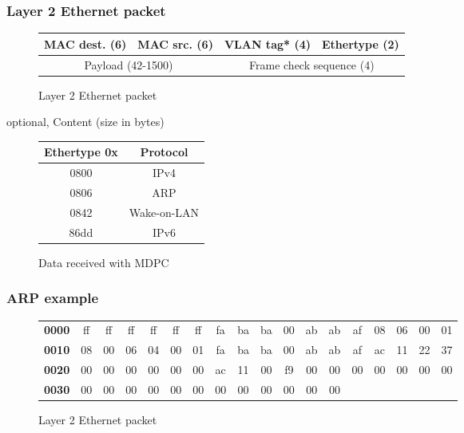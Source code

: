   \begin{frame}
    \frametitle{Layer 2 Ethernet packet}
      \begin{figure}[h]
      \centering
      \begin{tabular}{|c|c|c|c|c|c|c|c|c|}
        \hline
        \multicolumn{3}{|c|}{MAC dest. (\color{blue}6\color{black})} & \multicolumn{3}{|c|}{MAC src. (\color{blue}6\color{black})} & \multicolumn{2}{|c|}{\color{brown}VLAN tag* (\color{blue}4\color{brown})\color{black}} & Ethertype (\color{blue}2\color{black}) \\ \hline
        \multicolumn{6}{|c|}{Payload (\color{blue}42-1500\color{black})} & \multicolumn{3}{|c|}{Frame check sequence (\color{blue}4\color{black})}\\ \hline
      \end{tabular}
      \caption{Layer 2 Ethernet packet}
      \label{fig:eth_packet}
    \end{figure}
    \hfill \color{brown}optional\color{black}, Content (\color{blue}size in bytes\color{black})
    \begin{figure}[h]
      \centering
      \begin{tabular}{|c|c|}
        \hline
        \textbf{Ethertype 0x} & \textbf{Protocol} \\ \hline
        0800 & IPv4 \\ \hline
        0806 & ARP \\ \hline
        0842 & Wake-on-LAN \\ \hline
        86dd & IPv6 \\ \hline
      \end{tabular}
      \caption{Data received with MDPC}
      \label{fig:eth_type}
    \end{figure}
  \end{frame}


  \begin{frame}
    \frametitle{ARP example}
      \begin{figure}
      \centering
      \resizebox{11.5cm}{!} {
        \begin{tabular}{lccccccccccccccccc}
          \textbf{0000} & ff & ff & ff & ff & ff & ff & fa & ba & ba & 00 & ab & ab & af & 08 & 06 & 00 & 01 \\
          \textbf{0010} & 08 & 00 & 06 & 04 & 00 & 01 & fa & ba & ba & 00 & ab & ab & af & ac & 11 & 22 & 37 \\
          \textbf{0020} & 00 & 00 & 00 & 00 & 00 & 00 & ac & 11 & 00 & f9 & 00 & 00 & 00 & 00 & 00 & 00 & 00 \\
          \textbf{0030} & 00 & 00 & 00 & 00 & 00 & 00 & 00 & 00 & 00 & 00 & 00 & 00 \\
        \end{tabular}
      }
      \caption{Layer 2 Ethernet packet}
      \label{fig:arp_packet_ex}
    \end{figure}
  \end{frame}

